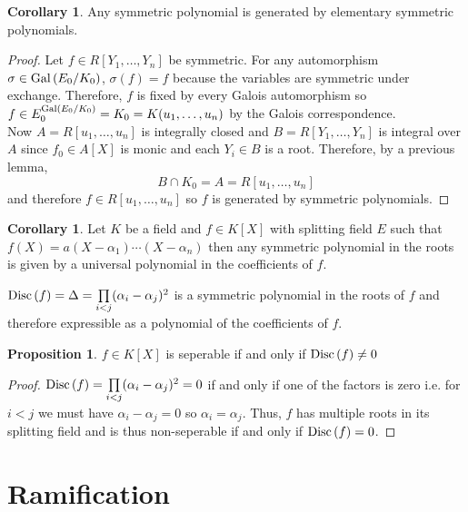 \documentclass[12pt]{extarticle}
\theoremstyle{definition}
\newtheorem{proposition}[theorem]{Proposition}
\newtheorem{corollary}[theorem]{Corollary}
\newenvironment{definition}[1][Definition:]{\begin{trivlist}
\item[\hskip \labelsep {\bfseries #1}]}{\end{trivlist}}
\begin{document}
\begin{corollary}
Any symmetric polynomial is generated by elementary symmetric polynomials.
\end{corollary}

\begin{proof}
Let $f \in R[Y_1, \dots, Y_n]$ be symmetric. For any automorphism $\sigma \in \mathrm{Gal}\left( E_0/K_0 \right)$, $\sigma(f) = f$ because the variables are symmetric under exchange. Therefore, $f$ is fixed by every Galois automorphism so $f \in E_0^{\mathrm{Gal}\left( E_0/K_0 \right)} = K_0 = K(u_1, \dots, u_n)$ by the Galois correspondence.
\bigskip\\
Now $A = R[u_1, \dots, u_n]$ is integrally closed and $B = R[Y_1, \dots, Y_n]$ is integral over $A$ since $f_0 \in A[X]$ is monic and each $Y_i \in B$ is a root. Therefore, by a previous lemma,
\[ B \cap K_0 = A = R[u_1, \dots, u_n] \]
and therefore $f \in R[u_1, \dots, u_n]$ so $f$ is generated by symmetric polynomials.
\end{proof}

\begin{corollary}
Let $K$ be a field and $f \in K[X]$ with splitting field $E$ such that $f(X) = a(X - \alpha_1) \cdots (X - \alpha_n)$ then any symmetric polynomial in the roots is given by a universal polynomial in the coefficients of $f$.  
\end{corollary}

\begin{definition}
$\mathrm{Disc}\left( f \right) = \Delta = \prod\limits_{i < j} (\alpha_i - \alpha_j)^2$ is a symmetric polynomial in the roots of $f$ and therefore expressible as a polynomial of the coefficients of $f$. 
\end{definition}

\begin{proposition}
$f \in K[X]$ is seperable if and only if $\mathrm{Disc}\left( f \right) \neq 0$
\end{proposition}

\begin{proof}
$\mathrm{Disc}\left( f \right) = \prod\limits_{i < j} (\alpha_i - \alpha_j)^2 = 0$ if and only if one of the factors is zero i.e. for $i < j$ we must have $\alpha_i - \alpha_j = 0$ so $\alpha_i = \alpha_j$. Thus, $f$ has multiple roots in its splitting field and is thus non-seperable if and only if $\mathrm{Disc}\left( f \right) = 0$. 
\end{proof}


\section{Ramification}
\end{document}
